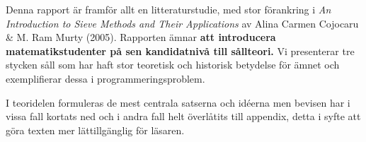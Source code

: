 
Denna rapport är framför allt en litteraturstudie, med stor förankring i \textit{An Introduction to Sieve Methods and Their Applications} av Alina Carmen Cojocaru \& M. Ram Murty (2005). Rapporten ämnar \textbf{att introducera matematikstudenter på sen kandidatnivå till sållteori.} Vi presenterar tre stycken såll som har haft stor teoretisk och historisk betydelse för ämnet och exemplifierar dessa i programmeringsproblem. 

I teoridelen formuleras de mest centrala satserna och idéerna men bevisen har i vissa fall kortats ned och i andra fall helt överlåtits till appendix, detta i syfte att göra texten mer lättillgänglig för läsaren.

